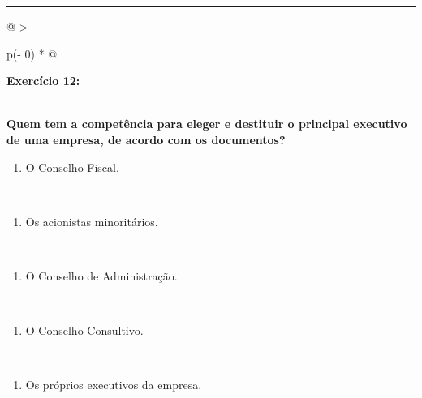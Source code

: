 \documentclass[
]{book}
\providecommand{\tightlist}{%
  \setlength{\itemsep}{0pt}\setlength{\parskip}{0pt}}
\begin{document}
\begin{center}\rule{0.5\linewidth}{0.5pt}\end{center}

\begin{longtable}[]{@{}
  >{\raggedright\arraybackslash}p{(\columnwidth - 0\tabcolsep) * }@{}}
\toprule\noalign{}
\begin{minipage}[b]{\linewidth}\raggedright
\textbf{Exercício 12:}
\end{minipage} \\
\midrule\noalign{}
\endhead
\bottomrule\noalign{}
\endlastfoot
\textbf{Quem tem a competência para eleger e destituir o principal executivo de uma empresa, de acordo com os documentos?} \\
\begin{minipage}[t]{\linewidth}\raggedright
\begin{enumerate}
\def\labelenumi{\alph{enumi})}
\tightlist
\item
  O Conselho Fiscal.
\end{enumerate}
\end{minipage} \\
\begin{minipage}[t]{\linewidth}\raggedright
\begin{enumerate}
\def\labelenumi{\alph{enumi})}
\setcounter{enumi}{1}
\tightlist
\item
  Os acionistas minoritários.
\end{enumerate}
\end{minipage} \\
\begin{minipage}[t]{\linewidth}\raggedright
\begin{enumerate}
\def\labelenumi{\alph{enumi})}
\setcounter{enumi}{2}
\tightlist
\item
  O Conselho de Administração.
\end{enumerate}
\end{minipage} \\
\begin{minipage}[t]{\linewidth}\raggedright
\begin{enumerate}
\def\labelenumi{\alph{enumi})}
\setcounter{enumi}{3}
\tightlist
\item
  O Conselho Consultivo.
\end{enumerate}
\end{minipage} \\
\begin{minipage}[t]{\linewidth}\raggedright
\begin{enumerate}
\def\labelenumi{\alph{enumi})}
\setcounter{enumi}{4}
\tightlist
\item
  Os próprios executivos da empresa.
\end{enumerate}
\end{minipage} \\
\end{longtable}
\end{document}
